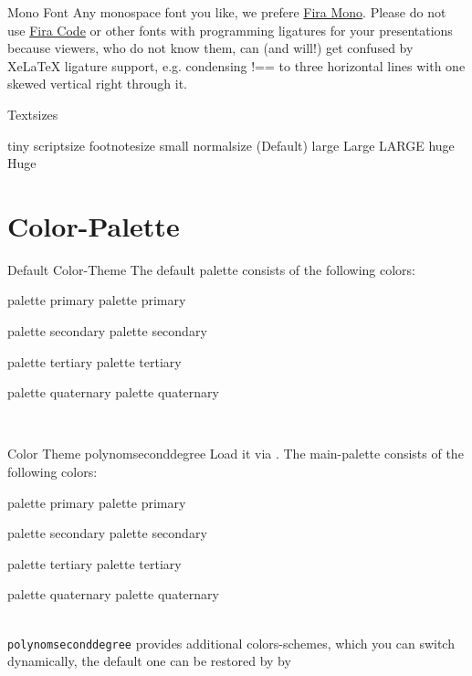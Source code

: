 \documentclass[fragile=singleslide]{beamer}
\begin{document}
\begin{frame}{Mono Font}
  Any monospace font you like, we prefere
  \href{https://mozilla.github.io/Fira/}{Fira Mono}. Please do not use
  \href{https://github.com/tonsky/FiraCode}{Fira Code} or other fonts with programming ligatures for your
  presentations because viewers, who do not know them, can (and will!)
  get confused by XeLaTeX ligature support, e.g. condensing !== to
  three horizontal lines with one skewed vertical right through it.
\end{frame}
 
\begin{frame}{Textsizes}
  
  {\tiny tiny}
  {\scriptsize scriptsize}
  {\footnotesize footnotesize}
  {\small small}
  {\normalsize normalsize} (Default)
  {\large large}
  {\Large Large}
  {\LARGE LARGE}
  {\huge huge}
  {\Huge Huge}
\end{frame}

\section{Color-Palette}

\newcommand{\clrbx}[1]{
  \begin{beamercolorbox}[wd=5em,ht=5ex,dp=1.125ex,center]{#1}
    \small#1
  \end{beamercolorbox}}
\newcommand{\paletteColors}{
  \clrbx{palette primary}
  \clrbx{palette secondary}
  \clrbx{palette tertiary}
  \clrbx{palette quaternary}}


\begin{frame}{Default Color-Theme}
  The default palette consists of the following colors:\\
  \paletteColors\\
\end{frame}



\begin{frame}{Color Theme polynomseconddegree}
  Load it via
  \texttt{}. The
  main-palette consists of the following colors:\\
  \paletteColors\\
  
  \texttt{polynomseconddegree} provides additional colors-schemes,
  which you can switch dynamically, the default one can be restored by by
  \texttt{\setPaletteBlue} 
\end{frame}
\end{document}
